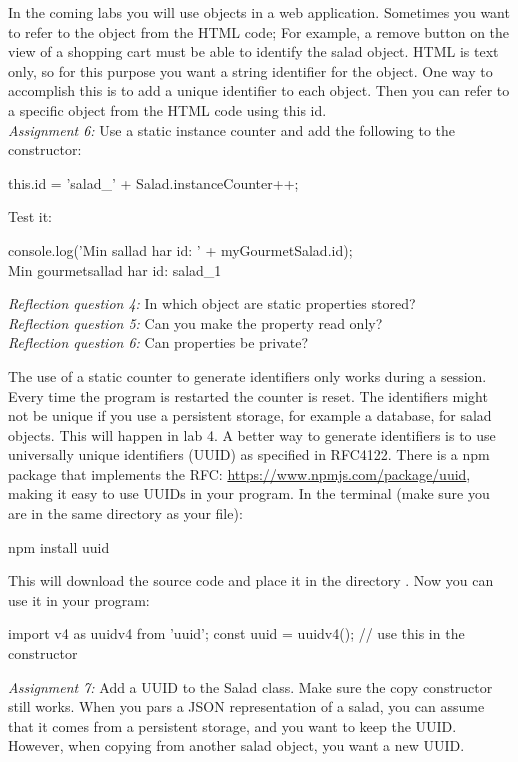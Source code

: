 \documentclass[fleqn, article, a4paper]{memoir}
\begin{document}
\begin{Assignments}
\item In the coming labs you will use  objects in a web application. Sometimes you want to refer to the object from the HTML code; For example, a remove button on the view of a shopping cart must be able to identify the salad object. HTML is text only, so for this purpose you want a string identifier for the object. One way to accomplish this is to add a unique identifier to each  object. Then you can refer to a specific object from the HTML code using this id.
\\\emph{Assignment 6:}
Use a static instance counter and add the following to the  constructor:
\begin{Code}
    this.id = 'salad_' + Salad.instanceCounter++;
\end{Code}
Test it:
\begin{Code}
console.log('Min sallad har id: ' + myGourmetSalad.id);
\\ Min gourmetsallad har id: salad_1
\end{Code}
\emph{Reflection question 4:} In which object are static properties stored?
\\\emph{Reflection question 5:} Can you make the  property read only?
\\\emph{Reflection question 6:} Can properties be private?

\item
The use of a static counter to generate identifiers only works during a session. Every time the program is restarted the counter is reset. The identifiers might not be unique if you use a persistent storage, for example a database, for salad objects. This will happen in lab 4. A better way to generate identifiers is to use universally unique identifiers (UUID) as specified in RFC4122. There is a npm package that implements the RFC: \url{https://www.npmjs.com/package/uuid}, making it easy to use UUIDs in your program. In the terminal (make sure you are in the same directory as your  file):
\begin{Code}
   npm install uuid
\end{Code}
This will download the source code and place it in the directory . Now you can use it in your program:
\begin{Code}
  import { v4 as uuidv4 } from 'uuid';
  const uuid = uuidv4();  // use this in the constructor
\end{Code}
\emph{Assignment 7:} Add a UUID to the Salad class. Make sure the copy constructor still works. When you pars a JSON representation of a salad, you can assume that it comes from a persistent storage, and you want to keep the UUID. However, when copying from another salad object, you want a new UUID.

\end{Assignments}
\end{document}
